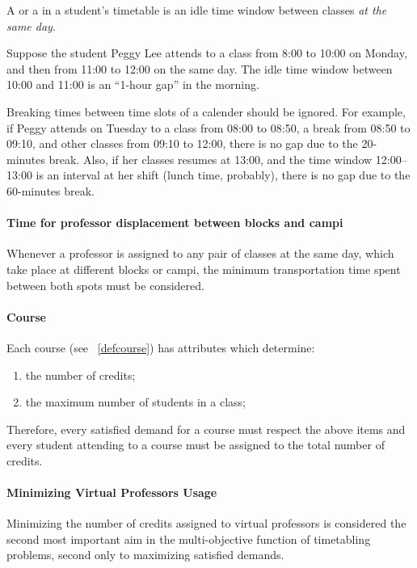 A  or a  in a student's timetable is an idle time window between classes \textit{at the same day}.

Suppose the student Peggy Lee attends to a class from 8:00 to 10:00 on Monday, and then from 11:00 to 12:00 on the same day. The idle time window between 10:00 and 11:00 is an ``1-hour gap'' in the morning.

Breaking times between time slots of a calender should be ignored. For example, if Peggy attends on Tuesday to a class from 08:00 to 08:50, a break from 08:50 to 09:10, and other classes from 09:10 to 12:00, there is no gap due to the 20-minutes break. Also, if her classes resumes at 13:00, and the time window 12:00--13:00 is an interval at her shift (lunch time, probably), there is no gap due to the 60-minutes break.


\paragraph{Time for professor displacement between blocks and campi}
\label{constrprofdisplactime}

Whenever a professor is assigned to any pair of classes at the same day, which take place at different blocks or campi, the minimum transportation time spent between both spots must be considered.


\paragraph{Course}
\label{constrcourse}

Each course (see ~\ref{defcourse}) has attributes which determine:

\begin{enumerate}
\item the number of credits;
\item the maximum number of students in a class;
\end{enumerate}

Therefore, every satisfied demand for a course must respect the above items and every student attending to a course must be assigned to the total number of credits.


\paragraph{Minimizing Virtual Professors Usage}
\label{constrvirtprof}

Minimizing the number of credits assigned to virtual professors is considered the second most important aim in the multi-objective function of timetabling problems, second only to maximizing satisfied demands.

